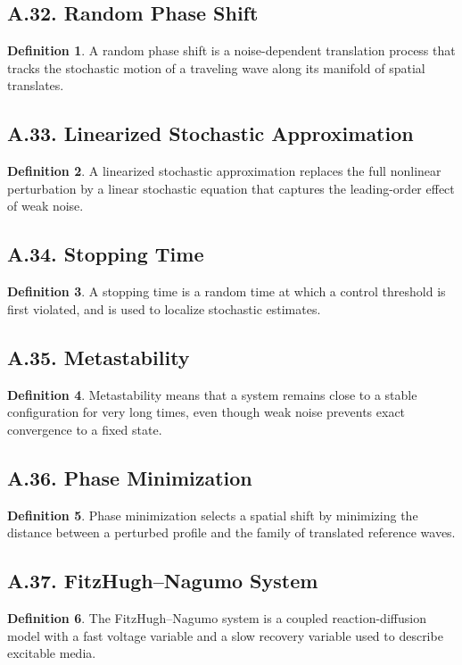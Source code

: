 \documentclass[11pt]{article}
\theoremstyle{definition}
\newtheorem{definition}{Definition}
\theoremstyle{remark}
\begin{document}
\subsection*{A.32. Random Phase Shift}
\begin{definition}
A random phase shift is a noise-dependent translation process that tracks the stochastic motion of a traveling wave along its manifold of spatial translates.
\end{definition}

\subsection*{A.33. Linearized Stochastic Approximation}
\begin{definition}
A linearized stochastic approximation replaces the full nonlinear perturbation by a linear stochastic equation that captures the leading-order effect of weak noise.
\end{definition}

\subsection*{A.34. Stopping Time}
\begin{definition}
A stopping time is a random time at which a control threshold is first violated, and is used to localize stochastic estimates.
\end{definition}

\subsection*{A.35. Metastability}
\begin{definition}
Metastability means that a system remains close to a stable configuration for very long times, even though weak noise prevents exact convergence to a fixed state.
\end{definition}

\subsection*{A.36. Phase Minimization}
\begin{definition}
Phase minimization selects a spatial shift by minimizing the distance between a perturbed profile and the family of translated reference waves.
\end{definition}

\subsection*{A.37. FitzHugh--Nagumo System}
\begin{definition}
The FitzHugh--Nagumo system is a coupled reaction-diffusion model with a fast voltage variable and a slow recovery variable used to describe excitable media.
\end{definition}
\end{document}
